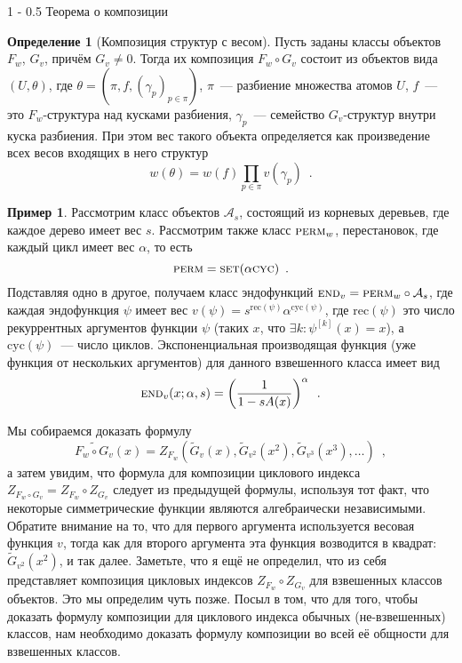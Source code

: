 \documentclass[a5paper]{article}
\makeatletter
\theoremstyle{definition}
\newtheorem{example}{Пример}
\newtheorem*{definition}{Определение}
\renewcommand{\section}{\@startsection
{section}%
{1}%
{\z@}%
{-\baselineskip}%
{0.5\baselineskip}%
{\centering\large\scshape}} %
\makeatother
\begin{document}
\section{Теорема о композиции}
\begin{definition}[Композиция структур с весом]
    Пусть заданы классы объектов \( F_w \), \( G_v \), причём \( G_v \neq 0 \).
Тогда их композиция \( F_w \circ G_v \) состоит из объектов вида \( (U, \theta)
\), где \( \theta = (\pi, f, (\gamma_p)_{p \in \pi} ) \), \( \pi \)~---
разбиение множества атомов \( U \), \( f \)~--- это \( F_w \)-структура над
кусками разбиения, \( \gamma_p \)~--- семейство \( G_v \)-структур внутри куска
разбиения. При этом вес такого объекта определяется как произведение всех весов
входящих в него структур
\[
    w(\theta) = w(f)\prod_{p \in \pi} v(\gamma_p) \enspace .
\]
\end{definition}
\begin{example}
    Рассмотрим класс объектов \( \mathcal A_s \), состоящий из корневых
деревьев, где каждое дерево имеет вес \( s \). Рассмотрим также класс \(
\text{\textsc{perm}}_w \), перестановок, где каждый цикл имеет вес \( \alpha \),
то есть
\[
    \text{\textsc{perm}} = \text{\textsc{set}} (\alpha \text{\textsc{cyc}})
\enspace .
\]
Подставляя одно в другое, получаем класс эндофункций \( {\text{\textsc{end}}_v =
\text{\textsc{perm}}_w
\circ \mathcal A_s} \), где каждая эндофункция \(\psi \) имеет вес \( v(\psi) =
s^{\mathrm{rec}(\psi)} \alpha^{\mathrm{cyc}(\psi)} \), где \( \mathrm{rec}(\psi)
\) это число рекуррентных аргументов функции \( \psi \) (таких \( x \), что \( \exists k
\colon \psi^{[k]}(x) = x \)), а \( \mathrm{cyc}(\psi) \)~--- число циклов. Экспоненциальная производящая функция (уже функция от нескольких
аргументов) для данного взвешенного класса имеет вид
\[
    \text{\textsc{end}}_v(x; \alpha, s) = \left(
        \dfrac{1}{1 - s A(x)}
    \right)^\alpha \enspace .
\]
\end{example}

    Мы собираемся доказать формулу
\[
    \widetilde{F_w \circ G_v} (x) = Z_{F_w} (\widetilde G_v(x), \widetilde
G_{v^2}(x^2) ,
\widetilde G_{v^3}(x^3), \ldots ) \enspace ,
\]
а затем увидим, что формула для композиции циклового индекса \( Z_{F_{w} \circ
G_{v}} =
Z_{F_w} \circ Z_{G_v} \) следует из предыдущей формулы, используя тот факт, что
некоторые симметрические функции являются алгебраически независимыми. Обратите
внимание на то, что для первого аргумента используется весовая функция \( v \),
тогда как для второго аргумента эта функция возводится в квадрат: \( \widetilde
G_{v^2}(x^2) \), и так далее.
Заметьте, что я ещё не определил, что из себя представляет композиция цикловых
индексов \( Z_{F_w}\circ Z_{G_v} \) для взвешенных классов объектов. Это мы определим чуть позже. Посыл в
том, что для того, чтобы доказать формулу композиции для циклового индекса обычных
(не-взвешенных) классов, нам необходимо доказать формулу композиции во всей её
общности для взвешенных классов.
\end{document}
